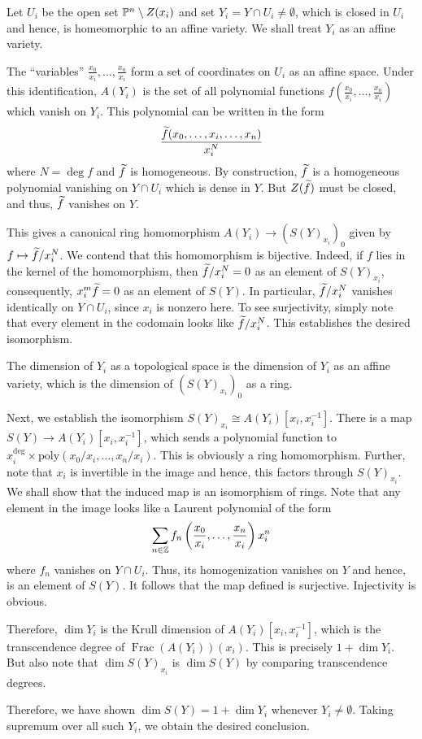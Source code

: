 \begin{exercise}
    Let $U_i$ be the open set $\mathbb{P}^n\setminus Z(x_i)$ and set $Y_i = Y\cap U_i\ne\emptyset$, which is closed in $U_i$ and hence, is homeomorphic to an affine variety. We shall treat $Y_i$ as an affine variety.

    The ``variables'' $\frac{x_0}{x_i},\dots,\frac{x_n}{x_i}$ form a set of coordinates on $U_i$ as an affine space. Under this identification, $A(Y_i)$ is the set of all polynomial functions $f\left(\frac{x_0}{x_i},\dots,\frac{x_n}{x_i}\right)$ which vanish on $Y_i$. This polynomial can be written in the form 
    \begin{equation*}
        \frac{\widetilde{f}(x_0,\dots, x_i,\dots, x_n)}{x_i^N}
    \end{equation*}
    where $N = \deg f$ and $\widetilde{f}$ is homogeneous. By construction, $\widetilde{f}$ is a homogeneous polynomial vanishing on $Y\cap U_i$ which is dense in $Y$. But $Z(\widetilde{f})$ must be closed, and thus, $\widetilde{f}$ vanishes on $Y$. 

    This gives a canonical ring homomorphism $A(Y_i)\to\left(S(Y)_{x_i}\right)_0$ given by $f\mapsto\widetilde{f}/x_i^N$. We contend that this homomorphism is bijective. Indeed, if $f$ lies in the kernel of the homomorphism, then $\widetilde{f}/x_i^N = 0$ as an element of $S(Y)_{x_i}$, consequently, $x_i^m\widetilde{f} = 0$ as an element of $S(Y)$. In particular, $\widetilde{f}/x_i^{N}$ vanishes identically on $Y\cap U_i$, since $x_i$ is nonzero here. To see surjectivity, simply note that every element in the codomain looks like $\widetilde{f}/x_i^N$. This establishes the desired isomorphism.

    The dimension of $Y_i$ as a topological space is the dimension of $Y_i$ as an affine variety, which is the dimension of $\left(S(Y)_{x_i}\right)_0$ as a ring.

    Next, we establish the isomorphism $S(Y)_{x_i}\cong A(Y_i)[x_i, x_i^{-1}]$. There is a map $S(Y)\to A(Y_i)[x_i, x_i^{-1}]$, which sends a polynomial function to $x_i^{\deg}\times\text{poly}(x_0/x_i,\dots,x_n/x_i)$. This is obviously a ring homomorphism. Further, note that $x_i$ is invertible in the image and hence, this factors through $S(Y)_{x_i}$. We shall show that the induced map is an isomorphism of rings. Note that any element in the image looks like a Laurent polynomial of the form
    \begin{equation*}
        \sum_{n\in\mathbb{Z}} f_n\left(\frac{x_0}{x_i},\dots,\frac{x_n}{x_i}\right)x_i^n
    \end{equation*}
    where $f_n$ vanishes on $Y\cap U_i$. Thus, its homogenization vanishes on $Y$ and hence, is an element of $S(Y)$. It follows that the map defined is surjective. Injectivity is obvious.

    Therefore, $\dim Y_i$ is the Krull dimension of $A(Y_i)[x_i, x_i^{-1}]$, which is the transcendence degree of $\operatorname{Frac}(A(Y_i))(x_i)$. This is precisely $1 + \dim Y_i$. But also note that $\dim S(Y)_{x_i}$ is $\dim S(Y)$ by comparing transcendence degrees.

    Therefore, we have shown $\dim S(Y) = 1 + \dim Y_i$ whenever $Y_i\ne\emptyset$. Taking supremum over all such $Y_i$, we obtain the desired conclusion.
\end{exercise}

